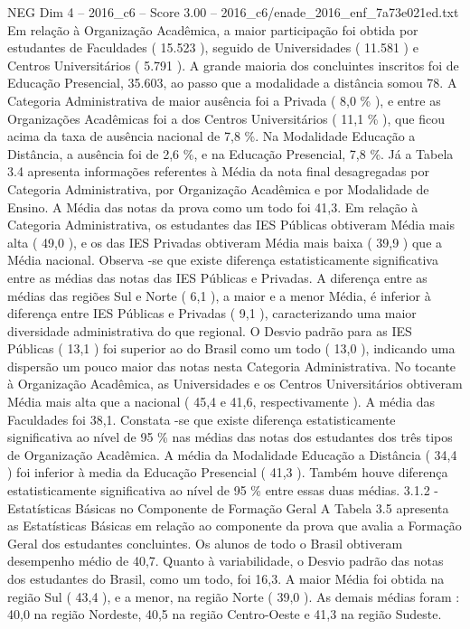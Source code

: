 \begin{textsample}{NEG Dim 4 – 2016\_c6 – Score 3.00 – 2016\_c6/enade\_2016\_enf\_7a73e021ed.txt}
Em relação à Organização Acadêmica, a maior participação foi obtida por estudantes de Faculdades ( 15.523 ), seguido de Universidades ( 11.581 ) e Centros Universitários ( 5.791 ).
A grande maioria dos concluintes inscritos foi de Educação Presencial, 35.603, ao passo que a modalidade a distância somou 78.
A Categoria Administrativa de maior ausência foi a Privada ( 8,0 \% ), e entre as Organizações Acadêmicas foi a dos Centros Universitários ( 11,1 \% ), que ficou acima da taxa de ausência nacional de 7,8 \%.
Na Modalidade Educação a Distância, a ausência foi de 2,6 \%, e na Educação Presencial, 7,8 \%.
Já a Tabela 3.4 apresenta informações referentes à Média da nota final desagregadas por Categoria Administrativa, por Organização Acadêmica e por Modalidade de Ensino.
A Média das notas da prova como um todo foi 41,3.
Em relação à Categoria Administrativa, os estudantes das IES Públicas obtiveram Média mais alta ( 49,0 ), e os das IES Privadas obtiveram Média mais baixa ( 39,9 ) que a Média nacional.
Observa -se que existe diferença estatisticamente significativa entre as médias das notas das IES Públicas e Privadas.
A diferença entre as médias das regiões Sul e Norte ( 6,1 ), a maior e a menor Média, é inferior à diferença entre IES Públicas e Privadas ( 9,1 ), caracterizando uma maior diversidade administrativa do que regional.
O Desvio padrão para as IES Públicas ( 13,1 ) foi superior ao do Brasil como um todo ( 13,0 ), indicando uma dispersão um pouco maior das notas nesta Categoria Administrativa.
No tocante à Organização Acadêmica, as Universidades e os Centros Universitários obtiveram Média mais alta que a nacional ( 45,4 e 41,6, respectivamente ).
A média das Faculdades foi 38,1.
Constata -se que existe diferença estatisticamente significativa ao nível de 95 \% nas médias das notas dos estudantes dos três tipos de Organização Acadêmica.
A média da Modalidade Educação a Distância ( 34,4 ) foi inferior à media da Educação Presencial ( 41,3 ).
Também houve diferença estatisticamente significativa ao nível de 95 \% entre essas duas médias. 3.1.2 - Estatísticas Básicas no Componente de Formação Geral A Tabela 3.5 apresenta as Estatísticas Básicas em relação ao componente da prova que avalia a Formação Geral dos estudantes concluintes.
Os alunos de todo o Brasil obtiveram desempenho médio de 40,7.
Quanto à variabilidade, o Desvio padrão das notas dos estudantes do Brasil, como um todo, foi 16,3.
A maior Média foi obtida na região Sul ( 43,4 ), e a menor, na região Norte ( 39,0 ).
As demais médias foram : 40,0 na região Nordeste, 40,5 na região Centro-Oeste e 41,3 na região Sudeste.

\end{textsample}
